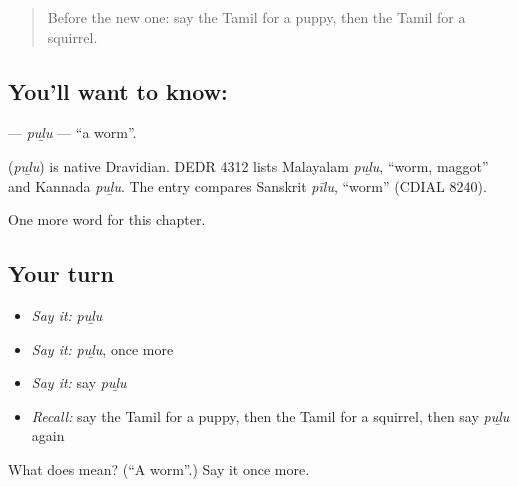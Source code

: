 \label{lesson:TA-C247-pulu}



\begin{quote}
Before the new one: say the Tamil for a puppy, then the Tamil for a squirrel.
\end{quote}

\subsection*{You'll want to know: }
\textbf{} — \emph{puḻu} — \textquotedblleft{}a worm\textquotedblright{}.

\begin{cousinweb}
\textbf{} (\emph{puḻu}) is native Dravidian. DEDR 4312 lists Malayalam \emph{puḻu}, \textquotedblleft{}worm, maggot\textquotedblright{} and Kannada \emph{puḻu}. The entry compares Sanskrit \emph{pīlu}, \textquotedblleft{}worm\textquotedblright{} (CDIAL 8240).
\end{cousinweb}

\begin{grammarlens}[title={What you've built}]
One more word for this chapter.
\end{grammarlens}

\subsection*{Your turn}
\begin{itemize}
\raggedright
  \item \emph{Say it:} \emph{puḻu}
  \item \emph{Say it:} \emph{puḻu}, once more
  \item \emph{Say it:} say \emph{puḻu}
  \item \emph{Recall:} say the Tamil for a puppy, then the Tamil for a squirrel, then say \emph{puḻu} again
\end{itemize}

\begin{tcolorbox}[breakable,colback=teal!4,colframe=teal!35!black,title={Before you move on}]
What does  mean? (\textquotedblleft{}A worm\textquotedblright{}.) Say it once more.
\end{tcolorbox}
